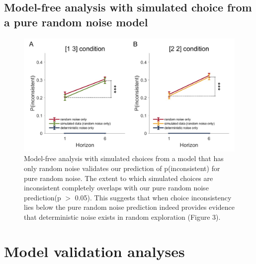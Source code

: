 \documentclass[12pt]{article}
\begin{document}
	\subsection{Model-free analysis with simulated choice from a pure random noise model}
	\begin{figure}[H]
	\begin{center}
		\includegraphics[width=\textwidth]{figures/RDBayes_pinconsistent_validation.jpg}
		\caption{Model-free analysis with simulated choices from a model that has only random noise validates our prediction of p(inconsistent) for pure random noise. The extent to which simulated choices are inconsistent completely overlaps with our pure random noise prediction(p $>$ 0.05). This suggests that when choice inconsistency lies below the pure random noise prediction indeed provides evidence that deterministic noise exists in random exploration (Figure 3).}
		\label{fig:s3}
	\end{center}
	\end{figure}
	\newpage
	\section{Model validation analyses}
\end{document}
